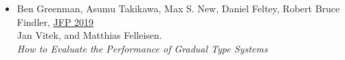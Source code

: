 \documentclass[11pt]{article}
\begin{document}



\begin{itemize}
\item
  Ben Greenman, Asumu Takikawa, Max S. New, Daniel Feltey, Robert Bruce Findler, \hfill \href{https://www.cambridge.org/core/journals/journal-of-functional-programming/article/abs/how-to-evaluate-the-performance-of-gradual-type-systems/DC765724C52A3A462F16C7FB3AD18697}{JFP 2019} \\
  Jan Vitek, and Matthias Felleisen. \\
  \emph{How to Evaluate the Performance of Gradual Type Systems}
\end{itemize}
\end{document}
